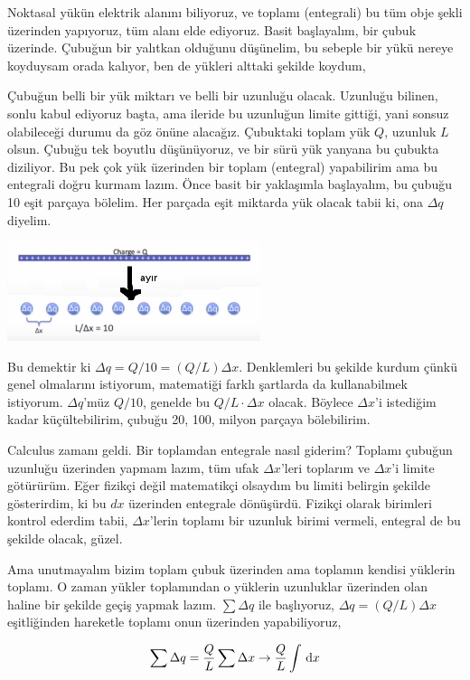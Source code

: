 \documentclass[12pt,fleqn]{article}\usepackage{../../common}
\begin{document}
Noktasal yükün elektrik alanını biliyoruz, ve toplamı (entegrali) bu tüm
obje şekli üzerinden yapıyoruz, tüm alanı elde ediyoruz. Basit başlayalım,
bir çubuk üzerinde. Çubuğun bir yalıtkan olduğunu düşünelim, bu sebeple bir
yükü nereye koyduysam orada kalıyor, ben de yükleri alttaki şekilde koydum, 

Çubuğun belli bir yük miktarı ve belli bir uzunluğu olacak. Uzunluğu
bilinen, sonlu kabul ediyoruz başta, ama ileride bu uzunluğun limite
gittiği, yani sonsuz olabileceği durumu da göz önüne alacağız. Çubuktaki
toplam yük $Q$, uzunluk $L$ olsun. Çubuğu tek boyutlu düşünüyoruz, ve
bir sürü yük yanyana bu çubukta diziliyor. Bu pek çok yük üzerinden bir
toplam (entegral) yapabilirim ama bu entegrali doğru kurmam lazım. Önce
basit bir yaklaşımla başlayalım, bu çubuğu 10 eşit parçaya bölelim. Her
parçada eşit miktarda yük olacak tabii ki, ona $\Delta q$ diyelim. 

\includegraphics[width=20em]{05_02.png}

Bu demektir ki $ \Delta q = Q/10 = (Q/L) \Delta x$. Denklemleri bu şekilde
kurdum çünkü genel olmalarını istiyorum, matematiği farklı şartlarda da
kullanabilmek istiyorum. $\Delta q$'müz $Q/10$, genelde bu $Q/L \cdot
\Delta x$ olacak. Böylece $\Delta x$'i istediğim kadar küçültebilirim,
çubuğu 20, 100, milyon parçaya bölebilirim. 

Calculus zamanı geldi. Bir toplamdan entegrale nasıl giderim? Toplamı
çubuğun uzunluğu üzerinden yapmam lazım, tüm ufak $\Delta x$'leri toplarım
ve $\Delta x$'i limite götürürüm. Eğer fizikçi değil matematikçi olsaydım
bu limiti belirgin şekilde gösterirdim, ki bu $dx$ üzerinden entegrale
dönüşürdü. Fizikçi olarak birimleri kontrol ederdim tabii, $\Delta x$'lerin
toplamı bir uzunluk birimi vermeli, entegral de bu şekilde olacak, güzel.

Ama unutmayalım bizim toplam çubuk üzerinden ama toplamın kendisi yüklerin
toplamı. O zaman yükler toplamından o yüklerin uzunluklar üzerinden olan
haline bir şekilde geçiş yapmak lazım. $\sum \Delta q$ ile başlıyoruz,
$\Delta q = (Q/L) \Delta x$ eşitliğinden hareketle toplamı onun üzerinden
yapabiliyoruz,

$$ \sum \Delta q = \frac{Q}{L} \sum \Delta x \to \frac{Q}{L} \int \,\mathrm{d} x $$
\end{document}
